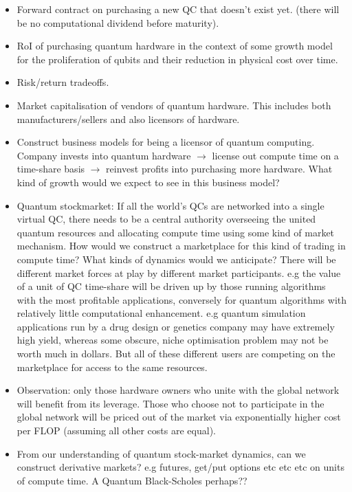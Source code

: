 \documentclass[aps, rmp, twocolumn, amsmath, amssymb, nofootinbib, superscriptaddress, longbibliography, floatfix, table-of-contents, eqsecnum]{revtex4-1}
\begin{document}
\begin{itemize}
	\item Forward contract on purchasing a new QC that doesn't exist yet. (there will be no computational dividend before maturity).
	\item RoI of purchasing quantum hardware in the context of some growth model for the proliferation of qubits and their reduction in physical cost over time.
	\item Risk/return tradeoffs.
	\item Market capitalisation of vendors of quantum hardware. This includes both manufacturers/sellers and also licensors of hardware.
	\item Construct business models for being a licensor of quantum computing. Company invests into quantum hardware $\to$ license out compute time on a time-share basis $\to$ reinvest profits into purchasing more hardware. What kind of growth would we expect to see in this business model?
	\item Quantum stockmarket: If all the world's QCs are networked into a single virtual QC, there needs to be a central authority overseeing the united quantum resources and allocating compute time using some kind of market mechanism. How would we construct a marketplace for this kind of trading in compute time? What kinds of dynamics would we anticipate? There will be different market forces at play by different market participants. e.g the value of a unit of QC time-share will be driven up by those running algorithms with the most profitable applications, conversely for quantum algorithms with relatively little computational enhancement. e.g quantum simulation applications run by a drug design or genetics company may have extremely high yield, whereas some obscure, niche optimisation problem may not be worth much in dollars. But all of these different users are competing on the marketplace for access to the same resources.
	\item Observation: only those hardware owners who unite with the global network will benefit from its leverage. Those who choose not to participate in the global network will be priced out of the market via exponentially higher cost per FLOP (assuming all other costs are equal).
	\item From our understanding of quantum stock-market dynamics, can we construct derivative markets? e.g futures, get/put options etc etc etc on units of compute time. A Quantum Black-Scholes perhaps??
\end{itemize}
\end{document}
